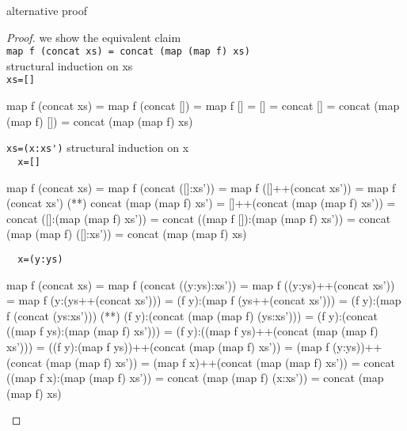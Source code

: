\newpage
alternative proof
\begin{proof} we show the equivalent claim \\
\verb|map f (concat xs) = concat (map (map f) xs)|\\
structural induction on xs\\
\verb|xs=[]|
\begin{code}
map f (concat xs) = map f (concat [])
                  = map f []
                  = []
                  = concat []
                  = concat (map (map f) [])
                  = concat (map (map f) xs)
\end{code}
\verb|xs=(x:xs')|
structural induction on x\\
\verb|  x=[]|
\begin{code}
map f (concat xs) = map f (concat ([]:xs'))
                  = map f ([]++(concat xs'))
                  = map f (concat xs')
                  (**) concat (map (map f) xs')
                  = []++(concat (map (map f) xs'))
                  = concat ([]:(map (map f) xs'))
                  = concat ((map f []):(map (map f) xs'))
                  = concat (map (map f) ([]:xs'))
                  = concat (map (map f) xs)
\end{code}
\verb|  x=(y:ys)|
\begin{code}
map f (concat xs) = map f (concat ((y:ys):xs'))
                  = map f ((y:ys)++(concat xs'))
                  = map f (y:(ys++(concat xs')))
                  = (f y):(map f (ys++(concat xs')))
                  = (f y):(map f (concat (ys:xs')))
                  (**) (f y):(concat (map (map f) (ys:xs')))
                  = (f y):(concat ((map f ys):(map (map f) xs')))
                  = (f y):((map f ys)++(concat (map (map f) xs')))
                  = ((f y):(map f ys))++(concat (map (map f) xs'))
                  = (map f (y:ys))++(concat (map (map f) xs'))
                  = (map f x)++(concat (map (map f) xs'))
                  = concat ((map f x):(map (map f) xs'))
                  = concat (map (map f) (x:xs'))
                  = concat (map (map f) xs)
\end{code}
\end{proof}